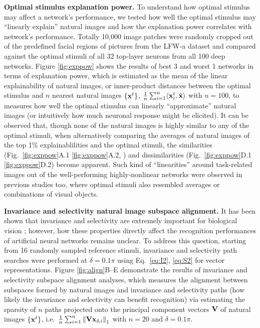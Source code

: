 \documentclass[10pt,twocolumn,letterpaper]{article}
\begin{document}
{\bf Optimal stimulus explanation power.} To understand how optimal stimulus may affect a network's performance, we {tested} how well the optimal stimulus may ``linearly explain'' natural images and how the explanation power correlates with network's performance.
Totally 10,000 image patches {were} randomly cropped out of the predefined facial regions of pictures from the LFW-a dataset \cite{wolf2011effective} and compared against the optimal stimuli of all 32 top-layer neurons from all 100 deep networks. 
Figure \ref{fig:exppow} shows the results of best 3 and worst 1 networks in terms of explanation power, which is estimated as the mean of the linear explainability of natural images, or inner-product distances between the optimal stimulus and $n$ nearest natural images $\left\lbrace {\bf{x}}^{t} \right\rbrace$, \ie $\frac{1}{n}\sum_{i=1}^{n} \langle {\bf{x}}^{t}_{i} , \hat{{\bf{x}}} \rangle$ with $n=100$, to measures how well the optimal stimulus can linearly ``approximate'' natural images (or intuitively how much neuronal response might be elicited).
It can be observed that, though none of the natural images is highly similar to any of the optimal stimuli, when alternatively comparing the averages of natural images of the top 1\% explainablilities and the optimal stimuli, the similarities (Fig.~\ref{fig:exppow}A.1 \vs \ref{fig:exppow}A.2, \etc) and dissimilarities (Fig.~\ref{fig:exppow}D.1 \vs \ref{fig:exppow}D.2) become apparent.
Such kind of ``linearities'' around task-related images out of the well-performing highly-nonlinear networks were observed in previous studies \cite{le2012building, simonyan2013deep} too, where optimal stimuli also resembled averages or combinations of visual objects.


{\bf Invariance and selectivity \vs natural image subspace alignment.} It has been shown that invariance and selectivity are extremely important for biological vision \cite{desimone1991face, ito1995size}; however, how these properties directly affect the recognition performances of artificial neural networks remains unclear.
To address this question, starting from 16 randomly sampled reference stimuli, invariance and selectivity path searches {were} performed at $\delta = 0.1\pi$ using Eq.~\ref{eq:I2}, \ref{eq:S2} for vector representations. 
Figure \ref{fig:align}B--E demonstrate the results of invariance and selectivity subspace alignment analyses, which measures the alignment between subspaces formed by natural images and invariance and selectivity paths (\ie how likely the invariance and selectivity can benefit recognition) via estimating the sparsity of $n$ paths projected onto the principal component vectors $\bf{V}$ of natural images $\left\lbrace {\bf{x}}^{t} \right\rbrace$, i.e.~$\frac{1}{n}\sum_{i=1}^{n} \left\| {\bf{Vx}}_{\delta,i} \right\|_{1}$ with $n=20$ and $\delta=0.1\pi$.
\end{document}
